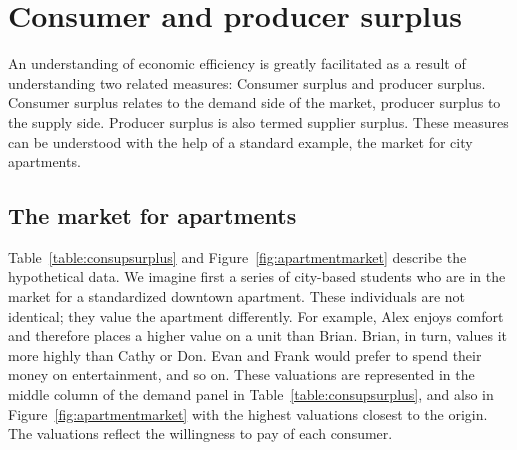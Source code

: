 \section{Consumer and producer surplus}\label{sec:ch5sec2}

An understanding of economic efficiency is greatly facilitated as a result
of understanding two related measures: Consumer surplus and producer
surplus. Consumer surplus relates to the demand side of the market, producer
surplus to the supply side. Producer surplus is also termed supplier
surplus. These measures can be understood with the help of a standard
example, the market for city apartments.

\subsection*{The market for apartments}

Table~\ref{table:consupsurplus} and Figure~\ref{fig:apartmentmarket}
describe the hypothetical data. We imagine first a series of city-based
students who are in the market for a standardized downtown apartment. These
individuals are not identical; they value the apartment differently. For
example, Alex enjoys comfort and therefore places a higher value on a unit
than Brian. Brian, in turn, values it more highly than Cathy or Don. Evan
and Frank would prefer to spend their money on entertainment, and so on.
These valuations are represented in the middle column of the demand panel in
Table~\ref{table:consupsurplus}, and also in Figure~\ref{fig:apartmentmarket}
with the highest valuations closest to the origin. The valuations reflect
the willingness to pay of each consumer.

